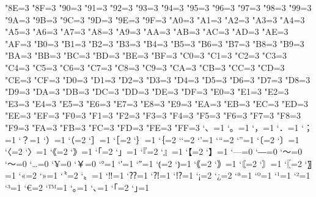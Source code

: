 \xspcode"8E=3
\xspcode"8F=3
\xspcode"90=3
\xspcode"91=3
\xspcode"92=3
\xspcode"93=3
\xspcode"94=3
\xspcode"95=3
\xspcode"96=3
\xspcode"97=3
\xspcode"98=3
\xspcode"99=3
\xspcode"9A=3
\xspcode"9B=3
\xspcode"9C=3
\xspcode"9D=3
\xspcode"9E=3
\xspcode"9F=3
\xspcode"A0=3
\xspcode"A1=3
\xspcode"A2=3
\xspcode"A3=3
\xspcode"A4=3
\xspcode"A5=3
\xspcode"A6=3
\xspcode"A7=3
\xspcode"A8=3
\xspcode"A9=3
\xspcode"AA=3
\xspcode"AB=3
\xspcode"AC=3
\xspcode"AD=3
\xspcode"AE=3
\xspcode"AF=3
\xspcode"B0=3
\xspcode"B1=3
\xspcode"B2=3
\xspcode"B3=3
\xspcode"B4=3
\xspcode"B5=3
\xspcode"B6=3
\xspcode"B7=3
\xspcode"B8=3
\xspcode"B9=3
\xspcode"BA=3
\xspcode"BB=3
\xspcode"BC=3
\xspcode"BD=3
\xspcode"BE=3
\xspcode"BF=3
\xspcode"C0=3
\xspcode"C1=3
\xspcode"C2=3
\xspcode"C3=3
\xspcode"C4=3
\xspcode"C5=3
\xspcode"C6=3
\xspcode"C7=3
\xspcode"C8=3
\xspcode"C9=3
\xspcode"CA=3
\xspcode"CB=3
\xspcode"CC=3
\xspcode"CD=3
\xspcode"CE=3
\xspcode"CF=3
\xspcode"D0=3
\xspcode"D1=3
\xspcode"D2=3
\xspcode"D3=3
\xspcode"D4=3
\xspcode"D5=3
\xspcode"D6=3
\xspcode"D7=3
\xspcode"D8=3
\xspcode"D9=3
\xspcode"DA=3
\xspcode"DB=3
\xspcode"DC=3
\xspcode"DD=3
\xspcode"DE=3
\xspcode"DF=3
\xspcode"E0=3
\xspcode"E1=3
\xspcode"E2=3
\xspcode"E3=3
\xspcode"E4=3
\xspcode"E5=3
\xspcode"E6=3
\xspcode"E7=3
\xspcode"E8=3
\xspcode"E9=3
\xspcode"EA=3
\xspcode"EB=3
\xspcode"EC=3
\xspcode"ED=3
\xspcode"EE=3
\xspcode"EF=3
\xspcode"F0=3
\xspcode"F1=3
\xspcode"F2=3
\xspcode"F3=3
\xspcode"F4=3
\xspcode"F5=3
\xspcode"F6=3
\xspcode"F7=3
\xspcode"F8=3
\xspcode"F9=3
\xspcode"FA=3
\xspcode"FB=3
\xspcode"FC=3
\xspcode"FD=3
\xspcode"FE=3
\xspcode"FF=3
\inhibitxspcode`、=1
\inhibitxspcode`。=1
\inhibitxspcode`，=1
\inhibitxspcode`．=1
\inhibitxspcode`；=1
\inhibitxspcode`？=1
\inhibitxspcode`）=1
\inhibitxspcode`（=2
\inhibitxspcode`］=1
\inhibitxspcode`［=2
\inhibitxspcode`｝=1
\inhibitxspcode`｛=2
\inhibitxspcode`‘=2
\inhibitxspcode`’=1
\inhibitxspcode`“=2
\inhibitxspcode`”=1
\inhibitxspcode`〔=2
\inhibitxspcode`〕=1
\inhibitxspcode`〈=2
\inhibitxspcode`〉=1
\inhibitxspcode`《=2
\inhibitxspcode`》=1
\inhibitxspcode`「=2
\inhibitxspcode`」=1
\inhibitxspcode`『=2
\inhibitxspcode`』=1
\inhibitxspcode`【=2
\inhibitxspcode`】=1
\inhibitxspcode`—=0%
\inhibitxspcode`―=0%
\inhibitxspcode`〜=0%
\inhibitxspcode`～=0%
\inhibitxspcode`…=0
\inhibitxspcode`¥=0%
\inhibitxspcode`￥=0%
\inhibitxspcode`°=1
\inhibitxspcode`′=1
\inhibitxspcode`″=1
\inhibitxspcode`⦅=2
\inhibitxspcode`⦆=1
\inhibitxspcode`｟=2
\inhibitxspcode`｠=1
\inhibitxspcode`〘=2
\inhibitxspcode`〙=1
\inhibitxspcode`〖=2
\inhibitxspcode`〗=1
\inhibitxspcode`«=2
\inhibitxspcode`»=1
\inhibitxspcode`〝=2
\inhibitxspcode`〟=1
\inhibitxspcode`‼=1
\inhibitxspcode`⁇=1
\inhibitxspcode`⁈=1
\inhibitxspcode`⁉=1
\inhibitxspcode`¡=2
\inhibitxspcode`¿=2
\inhibitxspcode`ª=1
\inhibitxspcode`º=1
\inhibitxspcode`¹=1
\inhibitxspcode`²=1
\inhibitxspcode`³=1
\inhibitxspcode`€=2
\inhibitxspcode`™=1
\inhibitxspcode`｡=1
\inhibitxspcode`､=1
\inhibitxspcode`｢=2
\inhibitxspcode`｣=1
\endinput
